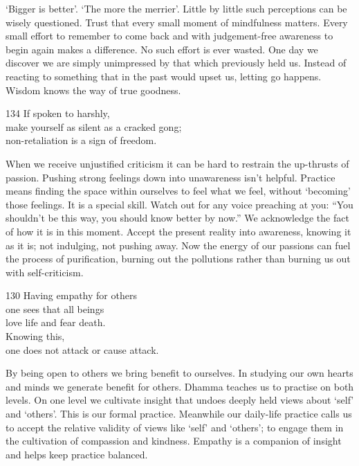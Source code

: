 \begin{dhpRefl}

`Bigger is better'. `The more the merrier'. Little by little such
perceptions can be wisely questioned. Trust that every small moment
of mindfulness matters. Every small effort to remember to come back
and with judgement-free awareness to begin again makes a difference.
No such effort is ever wasted. One day we discover we are simply
unimpressed by that which previously held us. Instead of reacting to
something that in the past would upset us, letting go happens. Wisdom
knows the way of true goodness.

\end{dhpRefl}


\begin{dhpVerse}{134}
\label{dhp-134}
If spoken to harshly,\\
make yourself as silent as a cracked gong;\\
non-retaliation is a sign of freedom.
\end{dhpVerse}

\begin{dhpRefl}

When we receive unjustified criticism it can be hard to restrain the
up-thrusts of passion. Pushing strong feelings down into unawareness
isn't helpful. Practice means finding the space within ourselves to
feel what we feel, without `becoming' those feelings. It is a special
skill. Watch out for any voice preaching at you: ``You shouldn't be
this way, you should know better by now.'' We acknowledge the fact of
how it is in this moment. Accept the present reality into awareness,
knowing it as it is; not indulging, not pushing away. Now the energy
of our passions can fuel the process of purification, burning out the
pollutions rather than burning us out with self-criticism.

\end{dhpRefl}


\begin{dhpVerse}{130}
\label{dhp-130}
Having empathy for others\\
one sees that all beings\\
love life and fear death.\\
Knowing this,\\
one does not attack or cause attack.
\end{dhpVerse}

\begin{dhpRefl}

By being open to others we bring benefit to ourselves. In studying
our own hearts and minds we generate benefit for others. Dhamma
teaches us to practise on both levels. On one level we cultivate
insight that undoes deeply held views about `self' and `others'. This
is our formal practice. Meanwhile our daily-life practice calls us to
accept the relative validity of views like `self' and `others'; to
engage them in the cultivation of compassion and kindness. Empathy is
a companion of insight and helps keep practice balanced.

\end{dhpRefl}

